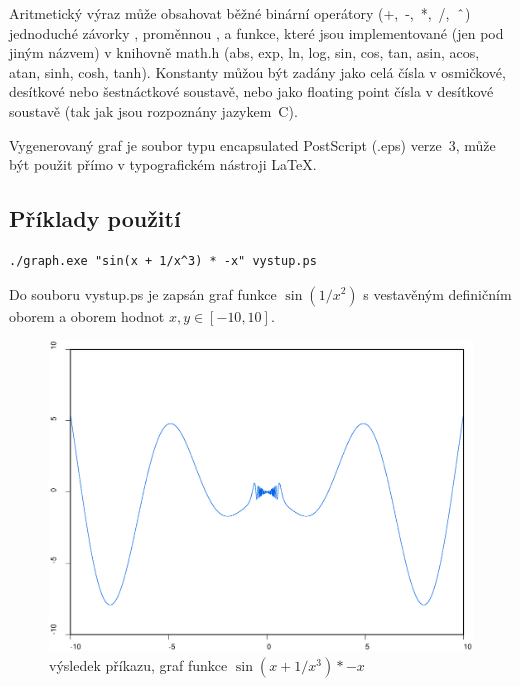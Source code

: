\documentclass[11pt]{article}
\newcommand\CARET{\mathbin{\char`\^}}
\begin{document}
Aritmetický výraz může obsahovat běžné binární operátory (+,~-,~*,~/,~$\CARET$)
jednoduché závorky \uv{()}, proměnnou , a funkce, které jsou
implementované (jen pod jiným názvem) v knihovně math.h (abs, exp, ln, log,
sin, cos, tan, asin, acos, atan, sinh, cosh, tanh). Konstanty můžou být zadány
jako celá čísla v osmičkové, desítkové nebo šestnáctkové soustavě, nebo jako
floating point čísla v desítkové soustavě (tak jak jsou rozpoznány jazykem~C).

Vygenerovaný graf je soubor typu encapsulated PostScript (.eps) verze~3, může
být použit přímo v typografickém nástroji \LaTeX.

\clearpage
\subsection{Příklady použití}
\begin{verbatim}
./graph.exe "sin(x + 1/x^3) * -x" vystup.ps 
\end{verbatim}
Do souboru vystup.ps je zapsán graf funkce $\sin (1 / x^2)$
s vestavěným definičním oborem a oborem hodnot $x, y \in [-10, 10]$.
\begin{figure}[ht!]
\centering
	\includegraphics[width=13cm]{figures/test1.eps}
	\caption{výsledek příkazu, graf funkce $\sin \left(x + 1/x^3 \right) * -x$}
\end{figure}
\clearpage
\end{document}
